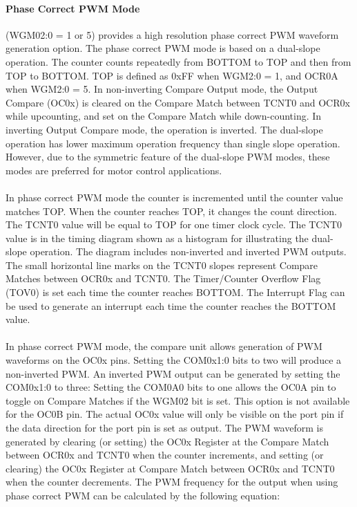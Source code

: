 \documentclass[english]{article}
\begin{document}
\paragraph{Phase Correct PWM Mode}(WGM02:0 = 1 or 5) provides a high resolution phase correct PWM waveform generation option. The phase correct PWM mode is based on a dual-slope operation. The counter counts repeatedly from BOTTOM to TOP and then from TOP to BOTTOM. TOP is defined as 0xFF when WGM2:0 = 1, and OCR0A when WGM2:0 = 5. In non-inverting Compare Output mode, the Output Compare (OC0x) is cleared on the Compare Match between TCNT0 and OCR0x while upcounting, and set on the Compare Match while down-counting. In inverting Output Compare mode, the operation is inverted. The dual-slope operation has lower maximum operation frequency than single slope operation. However, due to the symmetric feature of the dual-slope PWM modes, these modes are preferred for motor control
applications.\\\\
In phase correct PWM mode the counter is incremented until the counter value matches TOP. When the counter reaches TOP, it changes the count direction. The TCNT0 value will be equal to TOP for one timer clock cycle. The TCNT0 value is in the timing diagram shown as a histogram for illustrating
the dual-slope operation. The diagram includes non-inverted and inverted PWM outputs. The small horizontal line marks on the TCNT0 slopes represent Compare Matches between OCR0x and TCNT0.
The Timer/Counter Overflow Flag (TOV0) is set each time the counter reaches BOTTOM. The Interrupt Flag can be used to generate an interrupt each time the counter reaches the BOTTOM value.\\\\
In phase correct PWM mode, the compare unit allows generation of PWM waveforms on the OC0x pins. Setting the COM0x1:0 bits to two will produce a non-inverted PWM. An inverted PWM output can be generated by setting the COM0x1:0 to three: Setting the COM0A0 bits to one allows the OC0A pin to toggle on Compare Matches if the WGM02 bit is set. This option is not available for the OC0B pin. The actual OC0x value will only be visible on the port pin if the data direction for the port pin is set as output. The PWM waveform is generated by clearing (or setting) the OC0x Register at the Compare Match between OCR0x and TCNT0 when the counter increments, and setting (or clearing) the OC0x Register at Compare Match between OCR0x and TCNT0 when the counter decrements. The PWM frequency for the output when using phase correct PWM can be calculated by the following equation:
\end{document}
